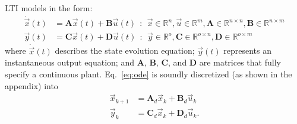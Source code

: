 \documentclass[runningheads,a4paper]{llncs}
\newcommand{\mat}[1]{\boldsymbol{#1}}
\begin{document}
LTI models in the form: 
%
\begin{align}
\dot{\vec{x}}(t)&=\mat{A}\vec{x}(t)+\mat{B}\vec{u}(t)\ \ :\ \ \vec{x} \in \mathbb{R}^{n}, \vec{u} \in \mathbb{R}^m, \mat{A} \in \mathbb{R}^{n \times n},\mat{B} \in \mathbb{R}^{n \times m}\\
\vec{y}(t)&=\mat{C}\vec{x}(t)+\mat{D}\vec{u}(t)\ \ :\ \ \vec{y} \in \mathbb{R}^{o}, \mat{C} \in \mathbb{R}^{o \times n}, \mat{D}  \in \mathbb{R}^{o \times m}\nonumber
\end{align}
\noindent where $\dot{\vec{x}}(t)$ describes the state evolution equation; 
$\vec{y}(t)$ represents an instantaneous output equation; and $\mat{A}$, $\mat{B}$, $\mat{C}$, and $\mat{D}$ are matrices that fully specify 
a continuous plant. Eq.~\eqref{eq:ode} is soundly discretized 
(as shown in the appendix) into
%
\begin{align}
\vec{x}_{k+1}&=\mat{A}_d\vec{x}_k+\mat{B}_d\vec{u}_k\\
\vec{y}_k&=\mat{C}_d\vec{x}_k+\mat{D}_d\vec{u}_k .\nonumber
\end{align}
%
\end{document}
